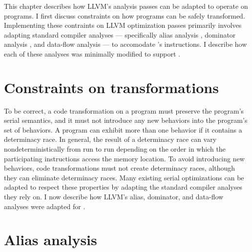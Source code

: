 
This chapter describes how LLVM's analysis passes can be adapted to
operate on \tapir programs.  I first discuss constraints on how
\tapir programs can be safely transformed.  Implementing these
contraints on LLVM optimization passes primarily involves adapting
standard compiler analyses --- specifically alias analysis
\cite[Ch.~12]{AhoLaSe06}, dominator analysis \cite[Ch.~9]{AhoLaSe06},
and data-flow analysis \cite[Ch.~9]{AhoLaSe06} --- to accomodate
\tapir's instructions.  I describe how each of these analyses was
minimally modified to support \tapir.

\section{Constraints on transformations}


To be correct, a code transformation on a \tapir program must preserve
the program's serial semantics, and it must not introduce any new
behaviors into the program's set of behaviors.  A program can exhibit
more than one behavior if it contains a determinacy race.  In general,
the result of a determinacy race can vary nondeterministically from
run to run depending on the order in which the participating
instructions access the memory location.  To avoid introducing new
behaviors, code transformations must not create determinacy races,
although they can eliminate determinacy races.  Many existing serial
optimizations can be adapted to respect these properties by adapting
the standard compiler analyses they rely on.  I now describe how
LLVM's alias, dominator, and data-flow analyses were
adapted for \tapir.


\section{Alias analysis}

